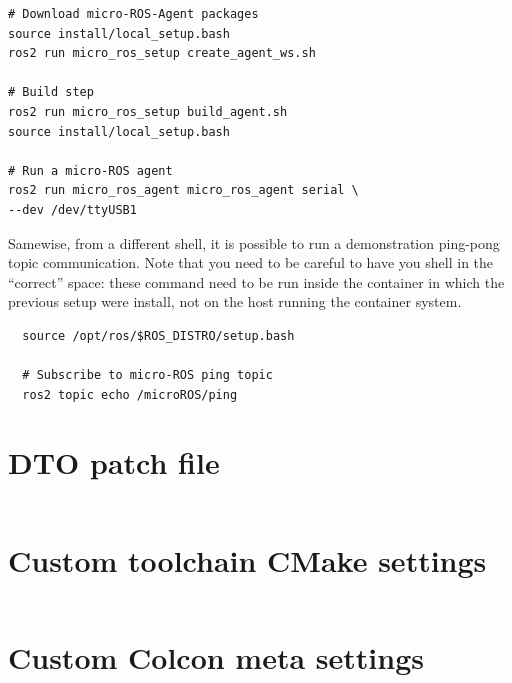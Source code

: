 \documentclass[10pt]{article}
\begin{document}
\begin{tcolorbox}
\begin{verbatim}
# Download micro-ROS-Agent packages
source install/local_setup.bash
ros2 run micro_ros_setup create_agent_ws.sh

# Build step
ros2 run micro_ros_setup build_agent.sh
source install/local_setup.bash

# Run a micro-ROS agent
ros2 run micro_ros_agent micro_ros_agent serial \
--dev /dev/ttyUSB1
\end{verbatim}
\end{tcolorbox}

Samewise, from a different shell, it is possible to run a demonstration ping-pong topic communication.
Note that you need to be careful to have you shell in the ``correct'' space: these command need to be run inside
the container in which the previous setup were install, not on the host running the container system.
\begin{tcolorbox}
\begin{verbatim}
  source /opt/ros/$ROS_DISTRO/setup.bash
  
  # Subscribe to micro-ROS ping topic
  ros2 topic echo /microROS/ping
\end{verbatim}
\end{tcolorbox}

\pagebreak
\appendix
\section{DTO patch file}
\label{sec:DTO patch file}
\inputminted[linenos]{diff}{./src/system.patch}

\pagebreak
\section{Custom toolchain CMake settings}
\label{sec:toolchainsettings}
\inputminted[linenos]{cmake}{./src/custom_r5f_toolchain.cmake}

\pagebreak
\section{Custom Colcon meta settings}
\label{sec:colconsettings}
\inputminted[linenos]{yaml}{./src/custom_r5f_colcon.meta}
\end{document}
